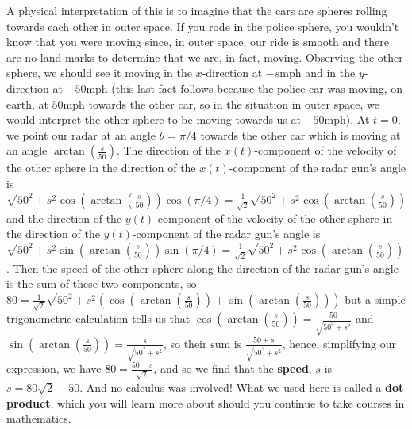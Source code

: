 \documentclass{ximera}
\begin{document}
\begin{exercise}
\begin{hint}
A physical interpretation of this is to imagine that the cars are spheres rolling towards each other in outer space. If you rode in the police sphere, you wouldn't know that you were moving since, in outer space, our ride is smooth and there are no land marks to determine that we are, in fact, moving. Observing the other sphere, we should see it moving in the $x$-direction at $-s$mph and in the $y$-direction at $-50$mph (this last fact follows because the police car was moving, on earth, at $50$mph towards the other car, so in the situation in outer space, we would interpret the other sphere to be moving towards us at $-50$mph). At $t=0$, we point our radar at an angle $\theta=\pi/4$ towards the other car which is moving at an angle $\arctan(\frac{s}{50})$. The direction of the $x(t)$-component of the velocity of the other sphere in the direction of the $x(t)$-component of the radar gun's angle is $\sqrt{50^2+s^2}\cos(\arctan(\frac{s}{50}))\cos(\pi/4)=\frac{1}{\sqrt{2}}\sqrt{50^2+s^2}\cos(\arctan(\frac{s}{50}))$ and the direction of the $y(t)$-component of the velocity of the other sphere in the direction of the $y(t)$-component of the radar gun's angle is $\sqrt{50^2+s^2}\sin(\arctan(\frac{s}{50}))\sin(\pi/4)=\frac{1}{\sqrt{2}}\sqrt{50^2+s^2}\cos(\arctan(\frac{s}{50}))$. Then the speed of the other sphere along the direction of the radar gun's angle is the sum of these two components, so $80=\frac{1}{\sqrt{2}}\sqrt{50^2+s^2}\left(\cos(\arctan(\frac{s}{50}))+\sin(\arctan(\frac{s}{50}))\right)$ but a simple trigonometric calculation tells us that $\cos(\arctan(\frac{s}{50}))=\frac{50}{\sqrt{50^2+s^2}}$ and $\sin(\arctan(\frac{s}{50}))=\frac{s}{\sqrt{50^2+s^2}}$, so their sum is $\frac{50+s}{\sqrt{50^2+s^2}}$, hence, simplifying our expression, we have $80=\frac{50+s}{\sqrt{2}}$, and so we find that the \textbf{speed}, $s$ is $s=80\sqrt{2}-50$. And no calculus was involved! What we used here is called a \textbf{dot product}, which you will learn more about should you continue to take courses in mathematics.
\end{hint}
\end{exercise}
\end{document}
